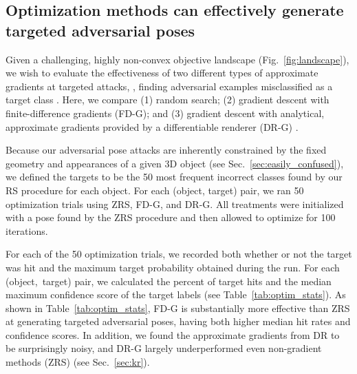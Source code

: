 \documentclass[10pt,twocolumn,letterpaper]{article}
\newcommand{\subsec}[1]{\noindent{\textbf{#1.}}}
\begin{document}
\subsection{Optimization methods can effectively generate targeted adversarial poses}
\label{sec:comparing_methods}

Given a challenging, highly non-convex objective landscape (Fig.~\ref{fig:landscape}), we wish to evaluate the effectiveness of two different types of approximate gradients at targeted attacks, \ie, finding adversarial examples misclassified as a target class \cite{szegedy2013intriguing}.
Here, we compare (1) random search; (2) gradient descent with finite-difference gradients (FD-G); and (3) gradient descent with analytical, approximate gradients provided by a differentiable renderer (DR-G) \cite{kato2018neural}.

\subsec{Experiment}
Because our adversarial pose attacks are inherently constrained by the fixed geometry and appearances of a given 3D object (see Sec.~\ref{sec:easily_confused}),
we defined the targets to be the 50 most frequent incorrect classes found by our RS procedure for each object.
For each (object, target) pair, we ran 50 optimization trials using ZRS, FD-G, and DR-G.
All treatments were initialized with a pose found by the ZRS procedure and then allowed to optimize for 100 iterations.

\subsec{Results}
For each of the 50 optimization trials, 
we recorded both whether or not the target was hit and the maximum target probability obtained during the run.
For each (object,~target) pair, we calculated the percent of target hits and the median maximum confidence score of the target labels (see Table~\ref{tab:optim_stats}).
As shown in Table~\ref{tab:optim_stats}, FD-G is substantially more effective than ZRS at generating targeted adversarial poses, having both higher median hit rates and confidence scores.
In addition, we found the approximate gradients from DR to be surprisingly noisy, and DR-G largely underperformed even non-gradient methods (ZRS) (see Sec.~\ref{sec:kr}).
\end{document}
